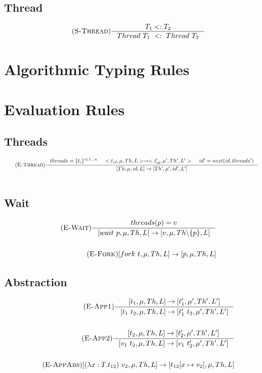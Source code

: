 \documentclass[12pt]{article}
\begin{document}
\subsection{Thread}
\begin{align*}
    \tag {\textsc{S-Thread}}
    \inference[]{T_1 <: T_2}{ Thread~T_1~<:~Thread~T_2}
\end{align*}

\section{Algorithmic Typing Rules}


\section{Evaluation Rules}

\subsection{Threads}
\begin{align*}
    \tag{\textsc{E-Thread}}
    \inference[]{threads = \{t_i\}^{i\in 1...n} & <t_{id},\mu,Th,L> -> <t_{id}',\mu',Th',L'> & id' = next(id,threads')}{[Th,\mu,id,L]->[Th',\mu',id',L']}
    \\
    \\
\end{align*}
\subsection{Wait}
\begin{align*}
    \tag {\textsc{E-Wait}}
    \inference{threads(p) = v}{[wait~p,\mu,Th,L] -> [v,\mu,Th\backslash\{p\},L]}
    \\
    \\
    \tag {\textsc{E-Fork}}
    {[fork\ t,\mu,Th, L]-> [p ,\mu, Th, L]}
\end{align*}

\subsection{Abstraction}
\begin{align*}
\tag {\textsc{E-App1}}
\inference[]{[t_1,\mu,Th,L]->[t_1',\mu',Th', L']}{[t_1~t_2,\mu,Th,L]->[t_1'~t_2,\mu',Th', L']}
\\
\\
\tag {\textsc{E-App2}}
\inference[]{[t_2,\mu,Th,L]->[t_2',\mu',Th', L']}{[v_1~t_2,\mu,Th,L]->[v_1~t_2',\mu',Th', L']}
\\
\\
\tag {\textsc{E-AppAbs}}
[(\lambda x:T.t_{12})~v_2,\mu,Th,L]->[t_{12}[x\mapsto v_2],\mu,Th, L]
\end{align*}
\end{document}
